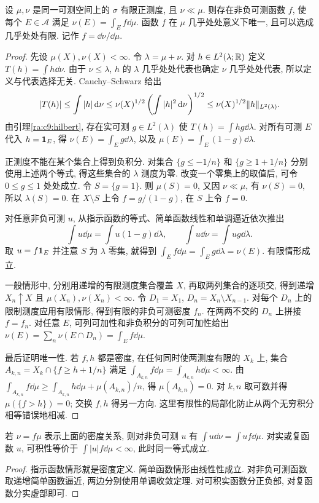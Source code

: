 \begin{theorem}\label{ra:c9:rn}
设 $\mu,\nu$ 是同一可测空间上的 $\sigma$ 有限正测度, 且 $\nu\ll\mu$. 则存在非负可测函数 $f$, 使每个 $E\in\mathcal A$ 满足 $\nu(E)=\int_E f\dd\mu$. 函数 $f$ 在 $\mu$ 几乎处处意义下唯一, 且可以选成几乎处处有限. 记作 $f=\dd\nu/\dd\mu$.
\end{theorem}
\begin{proof}
先设 $\mu(X),\nu(X)<\infty$. 令 $\lambda=\mu+\nu$. 对 $h\in L^2(\lambda;\mathbb R)$ 定义 $T(h)=\int h\dd\nu$. 由于 $\nu\le\lambda$, $h$ 的 $\lambda$ 几乎处处代表也确定 $\nu$ 几乎处处代表, 所以定义与代表选择无关. Cauchy--Schwarz 给出
\[
 |T(h)|\le\int |h|\,\mathrm d\nu
 \le\nu(X)^{1/2}\left(\int |h|^2\,\mathrm d\nu\right)^{1/2}
 \le\nu(X)^{1/2}\lVert h\rVert_{L^2(\lambda)}.
\]
由引理\ref{ra:c9:hilbert}, 存在实可测 $g\in L^2(\lambda)$ 使 $T(h)=\int hg\dd\lambda$. 对所有可测 $E$ 代入 $h=\mathbf 1_E$, 得 $\nu(E)=\int_E g\dd\lambda$, 以及 $\mu(E)=\int_E(1-g)\dd\lambda$.

正测度不能在某个集合上得到负积分. 对集合 $\{g\le-1/n\}$ 和 $\{g\ge1+1/n\}$ 分别使用上述两个等式, 得这些集合的 $\lambda$ 测度为零. 改变一个零集上的取值后, 可令 $0\le g\le1$ 处处成立. 令 $S=\{g=1\}$. 则 $\mu(S)=0$, 又因 $\nu\ll\mu$, 有 $\nu(S)=0$, 所以 $\lambda(S)=0$. 在 $X\setminus S$ 上令 $f=g/(1-g)$, 在 $S$ 上令 $f=0$.

对任意非负可测 $u$, 从指示函数的等式、简单函数线性和单调逼近依次推出
\[
 \int u\dd\mu=\int u(1-g)\dd\lambda,
 \qquad
 \int u\dd\nu=\int ug\dd\lambda.
\]
取 $u=f\mathbf 1_E$ 并注意 $S$ 为 $\lambda$ 零集, 就得到 $\int_E f\dd\mu=\int_E g\dd\lambda=\nu(E)$. 有限情形成立.

一般情形中, 分别用递增的有限测度集合覆盖 $X$, 再取两列集合的逐项交, 得到递增 $X_n\uparrow X$ 且 $\mu(X_n),\nu(X_n)<\infty$. 令 $D_1=X_1$, $D_n=X_n\setminus X_{n-1}$. 对每个 $D_n$ 上的限制测度应用有限情形, 得到有限的非负可测密度 $f_n$. 在两两不交的 $D_n$ 上拼接 $f=f_n$. 对任意 $E$, 可列可加性和非负积分的可列可加性给出 $\nu(E)=\sum_n\nu(E\cap D_n)=\int_Ef\dd\mu$.

最后证明唯一性. 若 $f,h$ 都是密度, 在任何同时使两测度有限的 $X_k$ 上, 集合 $A_{k,n}=X_k\cap\{f\ge h+1/n\}$ 满足
$\int_{A_{k,n}}f\dd\mu=\int_{A_{k,n}}h\dd\mu<\infty$. 由 $\int_{A_{k,n}}f\dd\mu\ge\int_{A_{k,n}}h\dd\mu+\mu(A_{k,n})/n$, 得 $\mu(A_{k,n})=0$. 对 $k,n$ 取可数并得 $\mu(\{f>h\})=0$; 交换 $f,h$ 得另一方向. 这里有限性的局部化防止从两个无穷积分相等错误地相减.
\end{proof}

\begin{proposition}\label{ra:c9:density-int}
若 $\nu=f\mu$ 表示上面的密度关系, 则对非负可测 $u$ 有 $\int u\dd\nu=\int uf\dd\mu$. 对实或复函数 $u$, 可积性等价于 $\int |u|f\dd\mu<\infty$, 此时同一等式成立.
\end{proposition}
\begin{proof}
指示函数情形就是密度定义. 简单函数情形由线性性成立. 对非负可测函数取递增简单函数逼近, 两边分别使用单调收敛定理. 对可积实函数分正负部, 对复函数分实虚部即可.
\end{proof}

